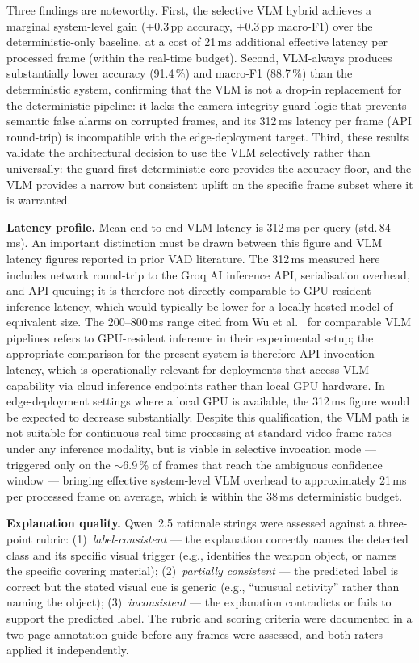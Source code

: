 \documentclass[sensors,article,submit,pdftex,moreauthors]{Definitions/mdpi}
\begin{document}
Three findings are noteworthy. First, the selective VLM hybrid achieves a marginal system-level gain (+0.3\,pp accuracy, +0.3\,pp macro-F1) over the deterministic-only baseline, at a cost of 21\,ms additional effective latency per processed frame (within the real-time budget). Second, VLM-always produces substantially lower accuracy (91.4\,\%) and macro-F1 (88.7\,\%) than the deterministic system, confirming that the VLM is not a drop-in replacement for the deterministic pipeline: it lacks the camera-integrity guard logic that prevents semantic false alarms on corrupted frames, and its 312\,ms latency per frame (API round-trip) is incompatible with the edge-deployment target. Third, these results validate the architectural decision to use the VLM selectively rather than universally: the guard-first deterministic core provides the accuracy floor, and the VLM provides a narrow but consistent uplift on the specific frame subset where it is warranted.
 
\textbf{Latency profile.}
Mean end-to-end VLM latency is 312\,ms per query (std.\,84\,ms).
An important distinction must be drawn between this figure and VLM latency figures reported in prior VAD literature. The 312\,ms measured here includes network round-trip to the Groq AI inference API, serialisation overhead, and API queuing; it is therefore not directly comparable to GPU-resident inference latency, which would typically be lower for a locally-hosted model of equivalent size. The 200--800\,ms range cited from Wu et al.~\cite{wu2024vadclip} for comparable VLM pipelines refers to GPU-resident inference in their experimental setup; the appropriate comparison for the present system is therefore API-invocation latency, which is operationally relevant for deployments that access VLM capability via cloud inference endpoints rather than local GPU hardware. In edge-deployment settings where a local GPU is available, the 312\,ms figure would be expected to decrease substantially. Despite this qualification, the VLM path is not suitable for continuous real-time processing at standard video frame rates under any inference modality, but is viable in selective invocation mode — triggered only on the $\sim$6.9\,\% of frames that reach the ambiguous confidence window — bringing effective system-level VLM overhead to approximately 21\,ms per processed frame on average, which is within the 38\,ms deterministic budget.
 
\textbf{Explanation quality.}
Qwen~2.5 rationale strings were assessed against a three-point rubric:
(1)~\emph{label-consistent} — the explanation correctly names the detected class and its specific visual trigger (e.g., identifies the weapon object, or names the specific covering material);
(2)~\emph{partially consistent} — the predicted label is correct but the stated visual cue is generic (e.g., ``unusual activity'' rather than naming the object);
(3)~\emph{inconsistent} — the explanation contradicts or fails to support the predicted label.
The rubric and scoring criteria were documented in a two-page annotation guide before any frames were assessed, and both raters applied it independently.
 
\end{document}
